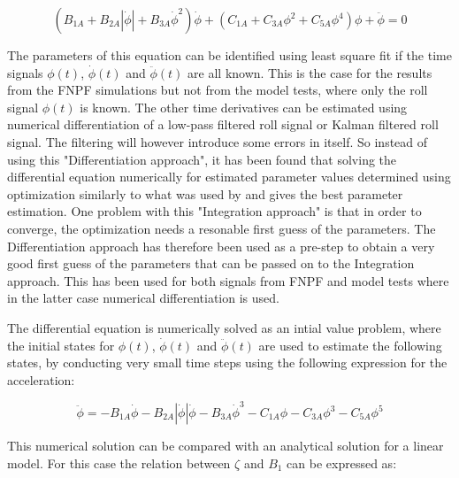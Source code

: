             
    
    \begin{equation}
\left(B_{1A} + B_{2A} \left|{\dot{\phi}}\right| + B_{3A} \dot{\phi}^{2}\right) \dot{\phi} + \left(C_{1A} + C_{3A} \phi^{2} + C_{5A} \phi^{4}\right) \phi + \ddot{\phi} = 0
\label{eq:roll_decay_equation_cubic_A}
\end{equation}

    

    The parameters of this equation can be identified using least square fit
if the time signals $\phi(t)$, $\dot{\phi}(t)$ and
$\ddot{\phi}(t)$ are all known. This is the case for the results from
the FNPF simulations but not from the model tests, where only the roll
signal $\phi(t)$ is known. The other time derivatives can be estimated
using numerical differentiation of a low-pass filtered roll signal or
Kalman filtered roll signal. The filtering will however introduce some
errors in itself. So instead of using this "Differentiation approach",
it has been found that solving the differential equation numerically for
estimated parameter values determined using optimization similarly to
what was used by \citep{7505983/FJHQJJUH} and \citep{7505983/24TNAV5Z}
gives the best parameter estimation. One problem with this "Integration
approach" is that in order to converge, the optimization needs a
resonable first guess of the parameters. The Differentiation approach
has therefore been used as a pre-step to obtain a very good first guess
of the parameters that can be passed on to the Integration approach.
This has been used for both signals from FNPF and model tests where in
the latter case numerical differentiation is used.

\quad The differential equation is numerically solved as an intial value
problem, where the initial states for $\phi(t)$, $\dot{\phi}(t)$ and
$\ddot{\phi}(t)$ are used to estimate the following states, by
conducting very small time steps using the following expression for the
acceleration:
 
            
    
    \begin{equation}
\ddot{\phi} = - B_{1A} \dot{\phi} - B_{2A} \left|{\dot{\phi}}\right| \dot{\phi} - B_{3A} \dot{\phi}^{3} - C_{1A} \phi - C_{3A} \phi^{3} - C_{5A} \phi^{5}
\label{eq:eq_phi1d}
\end{equation}

    

    This numerical solution can be compared with an analytical solution for
a linear model.  For this case the relation between $\zeta$ and $B_1$ can
be expressed as:
 
